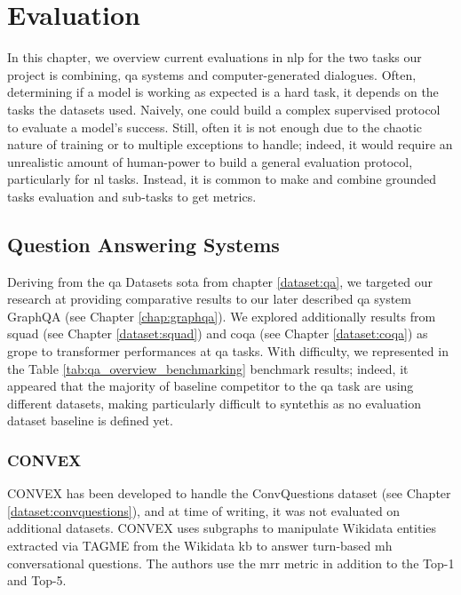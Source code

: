 \chapter{Evaluation}
\label{chap:evaluation}

In this chapter, we overview current evaluations in \gls{nlp} for the two tasks our project is combining, \gls{qa} systems and computer-generated dialogues. Often, determining if a model is working as expected is a hard task, it depends on the tasks the datasets used. Naively, one could build a complex supervised protocol to evaluate a model's success. Still, often it is not enough due to the chaotic nature of training or to multiple exceptions to handle; indeed, it would require an unrealistic amount of human-power to build a general evaluation protocol, particularly for \gls{nl} tasks. Instead, it is common to make and combine grounded tasks evaluation and sub-tasks to get metrics.


\section{Question Answering Systems}
Deriving from the \gls{qa} Datasets \gls{sota} from chapter \ref{dataset:qa}, we targeted our research at providing comparative results to our later described \gls{qa} system GraphQA (see Chapter \ref{chap:graphqa}). We explored additionally results from \gls{squad} (see Chapter \ref{dataset:squad}) and \gls{coqa} (see Chapter \ref{dataset:coqa}) as grope to \gls{transformer} performances at \gls{qa} tasks. With difficulty, we represented in the Table \ref{tab:qa_overview_benchmarking} benchmark results; indeed, it appeared that the majority of baseline competitor to the \gls{qa} task are using different datasets, making particularly difficult to syntethis as no evaluation dataset baseline is defined yet.

\subsection{CONVEX}
\label{eval:convex}
CONVEX \autocite{paper:convex} has been developed to handle the ConvQuestions dataset (see Chapter \ref{dataset:convquestions}), and at time of writing, it was not evaluated on additional datasets. CONVEX uses subgraphs to manipulate Wikidata entities extracted via TAGME \autocite{paper:CIKM-2010-FerraginaS} from the Wikidata \gls{kb} to answer turn-based \gls{mh} conversational questions. The authors use the \gls{mrr} metric in addition to the Top-1 and Top-5.

